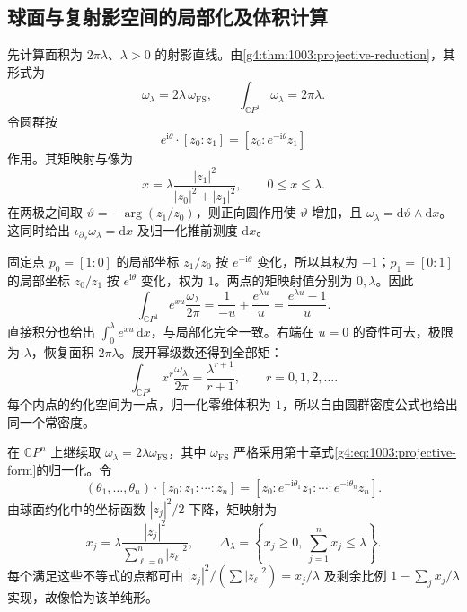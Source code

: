 \subsection{球面与复射影空间的局部化及体积计算}
\label{g4:subsec:1206:05}
先计算面积为 \(2\pi\lambda\)、\(\lambda>0\) 的射影直线。由\cref{g4:thm:1003:projective-reduction}，其形式为
\[
	\omega_\lambda=2\lambda\,\omega_{\mathrm{FS}},
	\qquad \int_{\mathbb CP^1}\omega_\lambda=2\pi\lambda.
\]
令圆群按
\[
	e^{\mathrm{i}\theta}\cdot[z_0:z_1]=[z_0:e^{-\mathrm{i}\theta}z_1]
\]
作用。其矩映射与像为
\[
	x=\lambda\frac{|z_1|^2}{|z_0|^2+|z_1|^2},\qquad 0\le x\le\lambda.
\]
在两极之间取 \(\vartheta=-\arg(z_1/z_0)\)，则正向圆作用使 \(\vartheta\) 增加，且 \(\omega_\lambda=\mathrm{d}\vartheta\wedge\mathrm{d}x\)。这同时给出 \(\iota_{\partial_\vartheta}\omega_\lambda=\mathrm{d}x\) 及归一化推前测度 \(\mathrm{d}x\)。

\begin{example}\label{g4:exm:1206:sphere-localization}
	固定点 \(p_0=[1:0]\) 的局部坐标 \(z_1/z_0\) 按 \(e^{-\mathrm{i}\theta}\) 变化，所以其权为 \(-1\)；\(p_1=[0:1]\) 的局部坐标 \(z_0/z_1\) 按 \(e^{\mathrm{i}\theta}\) 变化，权为 \(1\)。两点的矩映射值分别为 \(0,\lambda\)。因此
	\[
		\int_{\mathbb CP^1}e^{xu}\frac{\omega_\lambda}{2\pi}
		=\frac1{-u}+\frac{e^{\lambda u}}u
		=\frac{e^{\lambda u}-1}{u}.
	\]
	直接积分也给出 \(\int_0^\lambda e^{xu}\,\mathrm{d}x\)，与局部化完全一致。右端在 \(u=0\) 的奇性可去，极限为 \(\lambda\)，恢复面积 \(2\pi\lambda\)。展开幂级数还得到全部矩：
	\[
		\int_{\mathbb CP^1}x^r\frac{\omega_\lambda}{2\pi}
		=\frac{\lambda^{r+1}}{r+1},\qquad r=0,1,2,\ldots.
	\]
	每个内点的约化空间为一点，归一化零维体积为 \(1\)，所以自由圆群密度公式也给出同一个常密度。
\end{example}

在 \(\mathbb CP^n\) 上继续取 \(\omega_\lambda=2\lambda\omega_{\mathrm{FS}}\)，其中 \(\omega_{\mathrm{FS}}\) 严格采用第十章式\eqref{g4:eq:1003:projective-form}的归一化。令
\[
	(\theta_1,\ldots,\theta_n)\cdot[z_0:z_1:\cdots:z_n]
	=[z_0:e^{-\mathrm{i}\theta_1}z_1:\cdots:e^{-\mathrm{i}\theta_n}z_n].
\]
由球面约化中的坐标函数 \(|z_j|^2/2\) 下降，矩映射为
\begin{equation}\label{g4:eq:1206:projective-moment}
	x_j=\lambda\frac{|z_j|^2}{\sum_{\ell=0}^n|z_\ell|^2},
	\qquad
	\Delta_\lambda=\left\{x_j\ge0,\ \sum_{j=1}^n x_j\le\lambda\right\}.
\end{equation}
每个满足这些不等式的点都可由 \(|z_j|^2/( \sum|z_\ell|^2)=x_j/\lambda\) 及剩余比例 \(1-\sum_jx_j/\lambda\) 实现，故像恰为该单纯形。

